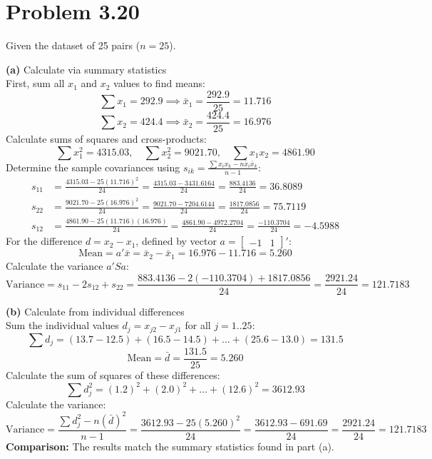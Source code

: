 \documentclass{article}
\begin{document}
\hrulefill

\section*{Problem 3.20}
Given the dataset of 25 pairs ($n=25$).

\noindent \textbf{(a)} Calculate via summary statistics \\
First, sum all $x_1$ and $x_2$ values to find means:
\[
\sum x_1 = 292.9 \implies \bar{x}_1 = \frac{292.9}{25} = 11.716
\]
\[
\sum x_2 = 424.4 \implies \bar{x}_2 = \frac{424.4}{25} = 16.976
\]
Calculate sums of squares and cross-products:
\[
\sum x_1^2 = 4315.03, \quad \sum x_2^2 = 9021.70, \quad \sum x_1 x_2 = 4861.90
\]
Determine the sample covariances using $s_{ik} = \frac{\sum x_i x_k - n\bar{x}_i \bar{x}_k}{n-1}$:
\begin{align*}
s_{11} &= \frac{4315.03 - 25(11.716)^2}{24} = \frac{4315.03 - 3431.6164}{24} = \frac{883.4136}{24} = 36.8089 \\
s_{22} &= \frac{9021.70 - 25(16.976)^2}{24} = \frac{9021.70 - 7204.6144}{24} = \frac{1817.0856}{24} = 75.7119 \\
s_{12} &= \frac{4861.90 - 25(11.716)(16.976)}{24} = \frac{4861.90 - 4972.2704}{24} = \frac{-110.3704}{24} = -4.5988
\end{align*}
For the difference $d = x_2 - x_1$, defined by vector $a = \begin{bmatrix} -1 & 1 \end{bmatrix}'$:
\[
\text{Mean} = a'\bar{x} = \bar{x}_2 - \bar{x}_1 = 16.976 - 11.716 = 5.260
\]
Calculate the variance $a'Sa$:
\[
\text{Variance} = s_{11} - 2s_{12} + s_{22} = \frac{883.4136 - 2(-110.3704) + 1817.0856}{24} = \frac{2921.24}{24} = 121.7183
\]

\noindent \textbf{(b)} Calculate from individual differences \\
Sum the individual values $d_j = x_{j2} - x_{j1}$ for all $j=1..25$:
\[
\sum d_j = (13.7 - 12.5) + (16.5 - 14.5) + \dots + (25.6 - 13.0) = 131.5
\]
\[
\text{Mean} = \bar{d} = \frac{131.5}{25} = 5.260
\]
Calculate the sum of squares of these differences:
\[
\sum d_j^2 = (1.2)^2 + (2.0)^2 + \dots + (12.6)^2 = 3612.93
\]
Calculate the variance:
\[
\text{Variance} = \frac{\sum d_j^2 - n(\bar{d})^2}{n-1} = \frac{3612.93 - 25(5.260)^2}{24} = \frac{3612.93 - 691.69}{24} = \frac{2921.24}{24} = 121.7183
\]
\textbf{Comparison:} The results match the summary statistics found in part (a).
\end{document}
